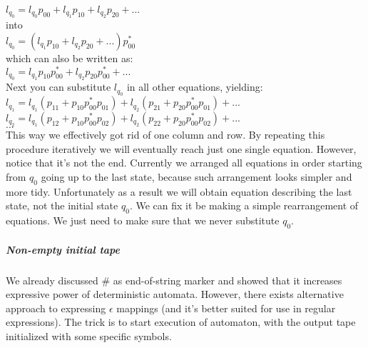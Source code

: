 \documentclass[12pt]{article}
\begin{document}
$l_{q_0} = l_{q_0}p_{00} + l_{q_1}p_{10} + l_{q_2}p_{20} + ...$ \\
into \\
$l_{q_0} =  (l_{q_1}p_{10} + l_{q_2}p_{20} + ...)p_{00}^*$ \\
which can also be written as: \\
$l_{q_0} =  l_{q_1}p_{10}p_{00}^* + l_{q_2}p_{20}p_{00}^* + ...$ \\
Next you can substitute $ l_{q_0}$ in all other equations, yielding: \\
$l_{q_1} = l_{q_1}(p_{11} + p_{10}p_{00}^*p_{01} )+ l_{q_2}(p_{21} + p_{20}p_{00}^*p_{01})+... $ \\
$l_{q_2} = l_{q_1}(p_{12} + p_{10}p_{00}^*p_{02}) + l_{q_2}(p_{22} + p_{20}p_{00}^*p_{02})+ ...$ \\
$...$\\
This way we effectively got rid of one column and row. By repeating this procedure iteratively we will eventually reach just one single equation. However, notice that it's not the end. Currently we arranged all equations in order starting from $q_0$ going up to the last state, because such arrangement looks simpler and more tidy. Unfortunately as a result we will obtain equation describing the last state, not the initial state $q_0$. We can fix it be making a simple rearrangement of equations. We just need to make sure that we never substitute $q_0$.






\subparagraph{Non-empty initial tape}
We already discussed $\#$ as end-of-string marker and showed that it increases expressive power of deterministic automata. However, there exists alternative approach to expressing $\epsilon$ mappings (and it's better suited for use in regular expressions). The trick is to start execution of automaton, with the output tape initialized with some specific symbols.
\end{document}
